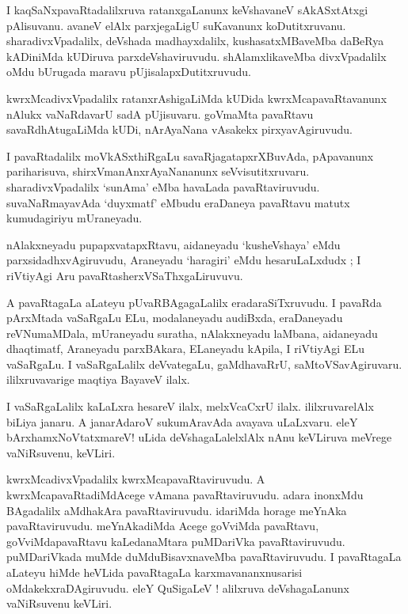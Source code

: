 \documentclass{article}
\begin{document}
\begin{mn}
I kaqSaNxpavaRtadalilxruva ratanxgaLanunx keVshavaneV sAkASxtAtxgi pAlisuvanu. avaneV elAlx
parxjegaLigU suKavanunx koDutitxruvanu. sharadivxVpadalilx, deVshada madhayxdalilx, 
kushasatxMBaveMba daBeRya kADiniMda kUDiruva parxdeVshaviruvudu. shAlamxlikaveMba 
divxVpadalilx oMdu bUrugada maravu pUjisalapxDutitxruvudu. 
\end{mn}

\begin{mn}
kwrxMcadivxVpadalilx ratanxrAshigaLiMda kUDida kwrxMcapavaRtavanunx nAlukx vaNaRdavarU 
sadA pUjisuvaru. goVmaMta pavaRtavu savaRdhAtugaLiMda kUDi, nArAyaNana vAsakekx pirxyavAgiruvudu.
\end{mn}

\begin{mn}
I pavaRtadalilx moVkASxthiRgaLu savaRjagatapxrXBuvAda, pApavanunx pariharisuva, 
shirxVmanAnxrAyaNananunx seVvisutitxruvaru. sharadivxVpadalilx `sunAma' eMba havaLada 
pavaRtaviruvudu. suvaNaRmayavAda `duyxmatf' eMbudu eraDaneya pavaRtavu matutx kumudagiriyu 
mUraneyadu.
\end{mn}

\begin{mn}
nAlakxneyadu pupapxvatapxRtavu, aidaneyadu `kusheVshaya' eMdu parxsidadhxvAgiruvudu,
Araneyadu `haragiri' eMdu hesaruLaLxdudx ; I riVtiyAgi Aru pavaRtasherxVSaThxgaLiruvuvu.
\end{mn}

\begin{mn}
A pavaRtagaLa aLateyu pUvaRBAgagaLalilx eradaraSiTxruvudu. I pavaRda pArxMtada vaSaRgaLu ELu,
modalaneyadu audiBxda, eraDaneyadu reVNumaMDala, mUraneyadu suratha, nAlakxneyadu laMbana, 
aidaneyadu dhaqtimatf, Araneyadu parxBAkara, ELaneyadu kApila, I riVtiyAgi ELu vaSaRgaLu.
I vaSaRgaLalilx deVvategaLu, gaMdhavaRrU, saMtoVSavAgiruvaru. ililxruvavarige maqtiya BayaveV ilalx.
\end{mn}

\begin{mn}
I vaSaRgaLalilx kaLaLxra hesareV ilalx, melxVcaCxrU ilalx. ililxruvarelAlx biLiya
janaru. A janarAdaroV sukumAravAda avayava uLaLxvaru. eleY bArxhamxNoVtatxmareV! uLida 
deVshagaLalelxlAlx nAnu keVLiruva meVrege vaNiRsuvenu, keVLiri.
\end{mn}

\begin{mn}
kwrxMcadivxVpadalilx kwrxMcapavaRtaviruvudu. A kwrxMcapavaRtadiMdAcege vAmana pavaRtaviruvudu.
adara inonxMdu BAgadalilx aMdhakAra pavaRtaviruvudu. idariMda horage meYnAka pavaRtaviruvudu. 
meYnAkadiMda Acege goVviMda pavaRtavu, goVviMdapavaRtavu kaLedanaMtara puMDariVka pavaRtaviruvudu.
puMDariVkada muMde duMduBisavxnaveMba pavaRtaviruvudu. I pavaRtagaLa aLateyu hiMde heVLida 
pavaRtagaLa karxmavananxnusarisi oMdakekxraDAgiruvudu. eleY QuSigaLeV ! alilxruva deVshagaLanunx 
vaNiRsuvenu keVLiri.
\end{mn}
\end{document}
